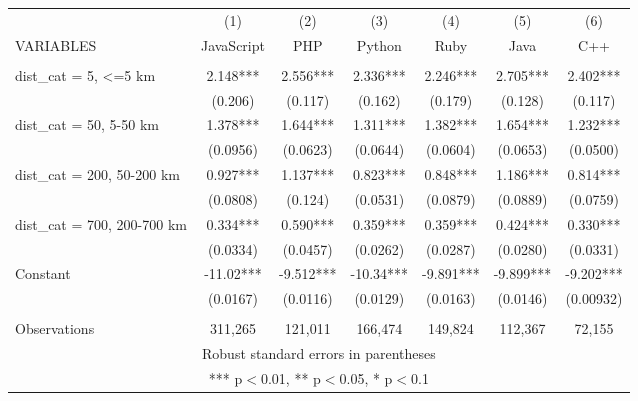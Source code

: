 \begin{tabular}{lcccccc} \hline
 & (1) & (2) & (3) & (4) & (5) & (6) \\
VARIABLES & JavaScript & PHP & Python & Ruby & Java & C++ \\ \hline
 &  &  &  &  &  &  \\
dist\_cat = 5, <=5 km & 2.148*** & 2.556*** & 2.336*** & 2.246*** & 2.705*** & 2.402*** \\
 & (0.206) & (0.117) & (0.162) & (0.179) & (0.128) & (0.117) \\
dist\_cat = 50, 5-50 km & 1.378*** & 1.644*** & 1.311*** & 1.382*** & 1.654*** & 1.232*** \\
 & (0.0956) & (0.0623) & (0.0644) & (0.0604) & (0.0653) & (0.0500) \\
dist\_cat = 200, 50-200 km & 0.927*** & 1.137*** & 0.823*** & 0.848*** & 1.186*** & 0.814*** \\
 & (0.0808) & (0.124) & (0.0531) & (0.0879) & (0.0889) & (0.0759) \\
dist\_cat = 700, 200-700 km & 0.334*** & 0.590*** & 0.359*** & 0.359*** & 0.424*** & 0.330*** \\
 & (0.0334) & (0.0457) & (0.0262) & (0.0287) & (0.0280) & (0.0331) \\
Constant & -11.02*** & -9.512*** & -10.34*** & -9.891*** & -9.899*** & -9.202*** \\
 & (0.0167) & (0.0116) & (0.0129) & (0.0163) & (0.0146) & (0.00932) \\
 &  &  &  &  &  &  \\
 Observations & 311,265 & 121,011 & 166,474 & 149,824 & 112,367 & 72,155 \\ \hline
\multicolumn{7}{c}{ Robust standard errors in parentheses} \\
\multicolumn{7}{c}{ *** p$<$0.01, ** p$<$0.05, * p$<$0.1} \\
\end{tabular}
